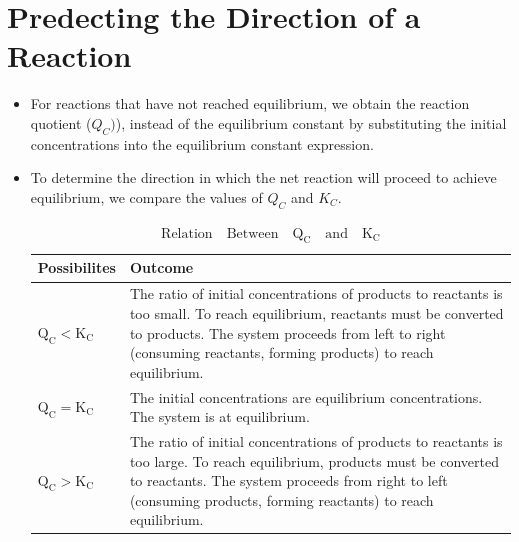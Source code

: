 \documentclass[a4paper,12pt,twocolumn]{article}
\begin{document}
\section{Predecting the Direction of a Reaction}
\begin{itemize}
    \item For reactions that have not reached equilibrium, we obtain the reaction quotient (\(Q_C)\)), instead of the equilibrium constant by substituting the initial concentrations into the equilibrium constant expression.
    \item To determine the direction in which the net reaction will proceed to achieve equilibrium, we compare the values of \(Q_C\) and \(K_C\).
          \begin{table}[h]
            \centering
            \def\arraystretch{1.5}
            \begin{tabular}{|l|p{2.3in}|}
                \hline
                Possibilites         & Outcome                                                               \\ \hline
                $\mathrm{Q_C < K_C}$ & The ratio of initial concentrations of products to reactants is too   
                small. To reach equilibrium, reactants must be converted to products.
                The system proceeds from left to right (consuming reactants,
                forming products) to reach equilibrium. \\ \hline
                $\mathrm{Q_C = K_C}$ & The initial concentrations are equilibrium concentrations. The system 
                is at equilibrium. \\ \hline
                $\mathrm{Q_C > K_C}$ & The ratio of initial concentrations of products to reactants is too   
                large. To reach equilibrium, products must be converted to reactants.
                The system proceeds from right to left (consuming products, forming
                reactants) to reach equilibrium. \\ \hline
            \end{tabular}
            \caption{$\mathrm{Relation\quad Between \quad Q_C \quad and \quad K_C}$}
          \end{table}
\end{itemize}
\end{document}
